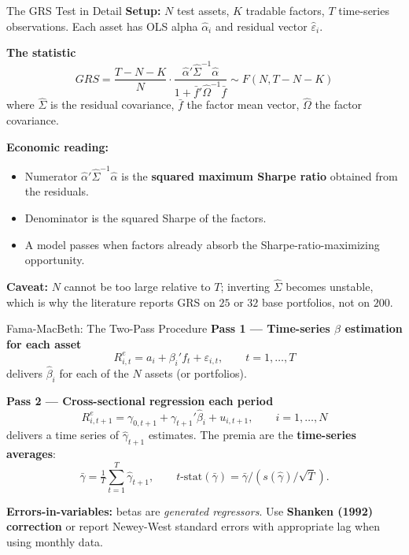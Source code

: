 \documentclass{beamer}
\begin{document}
\begin{frame}{The GRS Test in Detail}
	\textbf{Setup:} $N$ test assets, $K$ tradable factors, $T$ time-series observations. Each asset has OLS alpha $\hat\alpha_i$ and residual vector $\hat\varepsilon_i$.

	\vspace{0.2cm}
	\textbf{The statistic}
	\begin{equation*}
		GRS = \frac{T-N-K}{N} \cdot \frac{\hat{\alpha}'\hat{\Sigma}^{-1}\hat{\alpha}}{1 + \bar{f}' \hat{\Omega}^{-1} \bar{f}} \sim F(N, T-N-K)
	\end{equation*}
	where $\hat{\Sigma}$ is the residual covariance, $\bar{f}$ the factor mean vector, $\hat{\Omega}$ the factor covariance.

	\vspace{0.2cm}
	\textbf{Economic reading:}
	\begin{itemize}
		\item Numerator $\hat{\alpha}'\hat{\Sigma}^{-1}\hat{\alpha}$ is the \textbf{squared maximum Sharpe ratio} obtained from the residuals.
		\item Denominator is the squared Sharpe of the factors.
		\item A model passes when factors already absorb the Sharpe-ratio-maximizing opportunity.
	\end{itemize}

	\textbf{Caveat:} $N$ cannot be too large relative to $T$; inverting $\hat{\Sigma}$ becomes unstable, which is why the literature reports GRS on $25$ or $32$ base portfolios, not on $200$.
\end{frame}

\begin{frame}{Fama-MacBeth: The Two-Pass Procedure}
	\textbf{Pass 1 --- Time-series $\beta$ estimation for each asset}
	\begin{equation*}
		R_{i,t}^e = a_i + \beta_i' f_t + \varepsilon_{i,t}, \qquad t=1,\dots,T
	\end{equation*}
	delivers $\hat{\beta}_i$ for each of the $N$ assets (or portfolios).

	\vspace{0.2cm}
	\textbf{Pass 2 --- Cross-sectional regression each period}
	\begin{equation*}
		R_{i,t+1}^e = \gamma_{0,t+1} + \gamma_{t+1}' \hat{\beta}_i + u_{i,t+1}, \qquad i=1,\dots,N
	\end{equation*}
	delivers a time series of $\hat\gamma_{t+1}$ estimates. The premia are the \textbf{time-series averages}:
	\begin{equation*}
		\bar\gamma = \tfrac{1}{T}\sum_{t=1}^{T} \hat\gamma_{t+1}, \qquad
		t\text{-stat}(\bar\gamma) = \bar\gamma / \left(s(\hat\gamma)/\sqrt{T}\right).
	\end{equation*}

	\vspace{0.2cm}
	\textbf{Errors-in-variables:} betas are \emph{generated regressors}. Use \textbf{Shanken (1992) correction} or report Newey-West standard errors with appropriate lag when using monthly data.
\end{frame}
\end{document}
